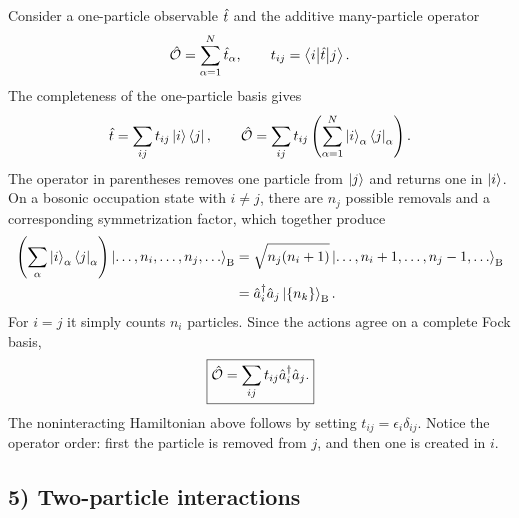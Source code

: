 Consider a one-particle observable $\hat{t}$ and the additive many-particle operator
\begin{equation}
\hat{\mathcal O}=\sum_{\alpha=1}^N\hat{t}_\alpha,\qquad
 t_{ij}=\left\langle i\middle|\hat{t}\middle|j\right\rangle.
\end{equation}
The completeness of the one-particle basis gives
\begin{equation}
\hat{t}=\sum_{ij}t_{ij}\left|i\right\rangle\left\langle j\right|,\qquad
\hat{\mathcal O}=\sum_{ij}t_{ij}\left(\sum_{\alpha=1}^N\left|i\right\rangle_\alpha\left\langle j\right|_\alpha\right).
\end{equation}
The operator in parentheses removes one particle from $\left|j\right\rangle$ and returns one in $\left|i\right\rangle$. On a bosonic occupation state with $i\ne j$, there are $n_j$ possible removals and a corresponding symmetrization factor, which together produce
\begin{equation}
\begin{aligned}
\left(\sum_{\alpha}\left|i\right\rangle_\alpha\left\langle j\right|_\alpha\right)
 \left|\ldots,n_i,\ldots,n_j,\ldots\right\rangle_{\mathrm B}
 &=\sqrt{n_j(n_i+1)}
 \left|\ldots,n_i+1,\ldots,n_j-1,\ldots\right\rangle_{\mathrm B}\\
 &=\hat{a}_i^\dagger\hat{a}_j\left|\{n_k\}\right\rangle_{\mathrm B}.
\end{aligned}
\end{equation}
For $i=j$ it simply counts $n_i$ particles. Since the actions agree on a complete Fock basis,
\begin{equation}
\boxed{\hat{\mathcal O}=\sum_{ij}t_{ij}\hat{a}_i^\dagger\hat{a}_j.}
\end{equation}
The noninteracting Hamiltonian above follows by setting $t_{ij}=\epsilon_i\delta_{ij}$. Notice the operator order: first the particle is removed from $j$, and then one is created in $i$.

\subsection*{5) Two-particle interactions}

